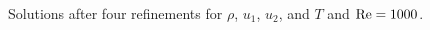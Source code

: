 \begin{figure}[!h]
\caption{Solutions after four refinements for $\rho$, $u_1$, $u_2$, and $T$ and $\Reyn = 1000$.}
\label{fig:Re500}
\end{figure}

